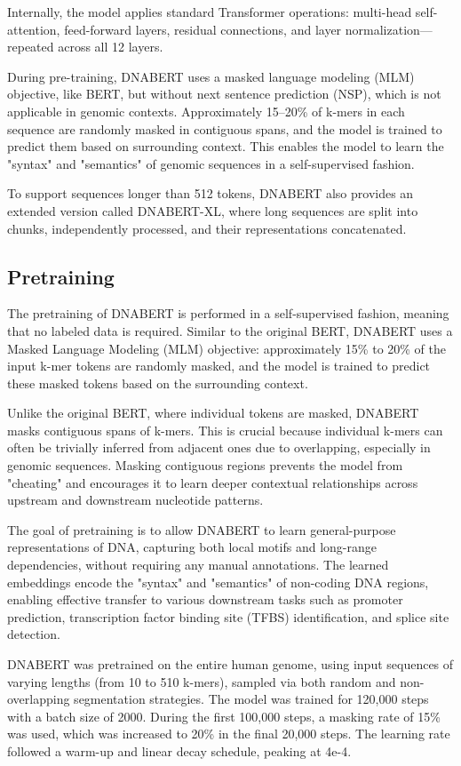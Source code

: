 Internally, the model applies standard Transformer operations: multi-head self-attention, feed-forward layers, residual connections, and layer normalization—repeated across all 12 layers.

During pre-training, DNABERT uses a masked language modeling (MLM) objective, like BERT, but without next sentence prediction (NSP), which is not applicable in genomic contexts. Approximately 15–20\% of k-mers in each sequence are randomly masked in contiguous spans, and the model is trained to predict them based on surrounding context. This enables the model to learn the "syntax" and "semantics" of genomic sequences in a self-supervised fashion.

To support sequences longer than 512 tokens, DNABERT also provides an extended version called DNABERT-XL, where long sequences are split into chunks, independently processed, and their representations concatenated.

\subsection{Pretraining}

The pretraining of DNABERT is performed in a self-supervised fashion, meaning that no labeled data is required. Similar to the original BERT, DNABERT uses a Masked Language Modeling (MLM) objective: approximately 15\% to 20\% of the input k-mer tokens are randomly masked, and the model is trained to predict these masked tokens based on the surrounding context.

Unlike the original BERT, where individual tokens are masked, DNABERT masks contiguous spans of k-mers. This is crucial because individual k-mers can often be trivially inferred from adjacent ones due to overlapping, especially in genomic sequences. Masking contiguous regions prevents the model from "cheating" and encourages it to learn deeper contextual relationships across upstream and downstream nucleotide patterns.

The goal of pretraining is to allow DNABERT to learn general-purpose representations of DNA, capturing both local motifs and long-range dependencies, without requiring any manual annotations. The learned embeddings encode the "syntax" and "semantics" of non-coding DNA regions, enabling effective transfer to various downstream tasks such as promoter prediction, transcription factor binding site (TFBS) identification, and splice site detection.

DNABERT was pretrained on the entire human genome, using input sequences of varying lengths (from 10 to 510 k-mers), sampled via both random and non-overlapping segmentation strategies. The model was trained for 120,000 steps with a batch size of 2000. During the first 100,000 steps, a masking rate of 15\% was used, which was increased to 20\% in the final 20,000 steps. The learning rate followed a warm-up and linear decay schedule, peaking at 4e-4. 

